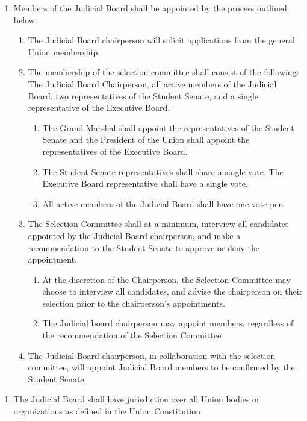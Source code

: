 \begin{enumerate}
\item Members of the Judicial Board shall be appointed by the process outlined below.
  \begin{enumerate}
  \item The Judicial Board chairperson will solicit applications from the general Union membership.
  \item The membership of the selection committee shall consist of the following: The Judicial Board Chairperson, all active members of the Judicial Board, two representatives of the Student Senate, and a single representative of the Executive Board.
    \begin{enumerate}
    \item The Grand Marshal shall appoint the representatives of the Student Senate and the President of the Union shall appoint the representatives of the Executive Board.
    \item The Student Senate representatives shall share a single vote. The Executive Board representative shall have a single vote.
    \item All active members of the Judicial Board shall have one vote per.
    \end{enumerate}
  \item The Selection Committee shall at a minimum, interview all candidates appointed by the Judicial Board chairperson, and make a recommendation to the Student Senate to approve or deny the appointment.
    \begin{enumerate}
    \item At the discretion of the Chairperson, the Selection Committee may choose to interview all candidates, and advise the chairperson on their selection prior to the chairperson's appointments.
    \item The Judicial board chairperson may appoint members, regardless of the recommendation of the Selection Committee.
    \end{enumerate}
  \item The Judicial Board chairperson, in collaboration with the selection committee, will appoint Judicial Board members to be confirmed by the Student Senate.
  \end{enumerate}
\end{enumerate}


\begin{enumerate}
\item The Judicial Board shall have jurisdiction over all Union bodies or organizations as defined in the Union Constitution
\end{enumerate}

